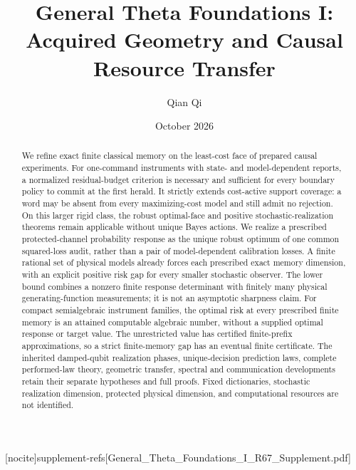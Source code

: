 
[nocite]{supplement-refs}[General_Theta_Foundations_I_R67_Supplement.pdf]
\title[Acquired geometry and causal resource transfer]{General Theta Foundations I:\\Acquired Geometry and Causal Resource Transfer}
\author{Qian Qi}\date{October 2026}

\begin{abstract}
We refine exact finite classical memory on the least-cost face of prepared causal experiments. For one-command instruments with state- and model-dependent reports, a normalized residual-budget criterion is necessary and sufficient for every boundary policy to commit at the first herald. It strictly extends cost-active support coverage: a word may be absent from every maximizing-cost model and still admit no rejection. On this larger rigid class, the robust optimal-face and positive stochastic-realization theorems remain applicable without unique Bayes actions. We realize a prescribed protected-channel probability response as the unique robust optimum of one common squared-loss audit, rather than a pair of model-dependent calibration losses. A finite rational set of physical models already forces each prescribed exact memory dimension, with an explicit positive risk gap for every smaller stochastic observer. The lower bound combines a nonzero finite response determinant with finitely many physical generating-function measurements; it is not an asymptotic sharpness claim. For compact semialgebraic instrument families, the optimal risk at every prescribed finite memory is an attained computable algebraic number, without a supplied optimal response or target value. The unrestricted value has certified finite-prefix approximations, so a strict finite-memory gap has an eventual finite certificate. The inherited damped-qubit realization phases, unique-decision prediction laws, complete performed-law theory, geometric transfer, spectral and communication developments retain their separate hypotheses and full proofs. Fixed dictionaries, stochastic realization dimension, protected physical dimension, and computational resources are not identified.
\end{abstract}
\maketitle







